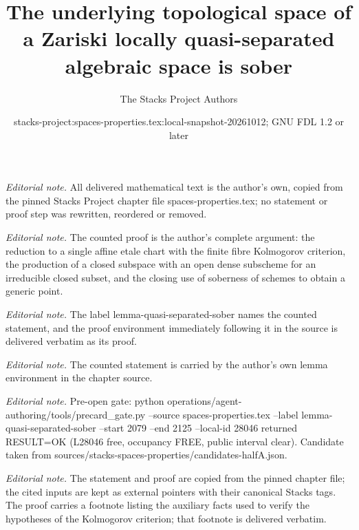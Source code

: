 \documentclass[10pt,a4paper]{amsart}
\title{The underlying topological space of a Zariski locally quasi-separated algebraic space is sober}
\author{The Stacks Project Authors}
\date{stacks-project:spaces-properties.tex:local-snapshot-20261012; GNU FDL 1.2 or later}
\theoremstyle{plain}
\theoremstyle{definition}
\theoremstyle{remark}
\numberwithin{equation}{subsection}
\begin{document}
\maketitle
\noindent\textit{Editorial note.} All delivered mathematical text is the author's own, copied from the pinned Stacks Project chapter file spaces-properties.tex; no statement or proof step was rewritten, reordered or removed.\par\medskip
\noindent\textit{Editorial note.} The counted proof is the author's complete argument: the reduction to a single affine etale chart with the finite fibre Kolmogorov criterion, the production of a closed subspace with an open dense subscheme for an irreducible closed subset, and the closing use of soberness of schemes to obtain a generic point.\par\medskip
\noindent\textit{Editorial note.} The label lemma-quasi-separated-sober names the counted statement, and the proof environment immediately following it in the source is delivered verbatim as its proof.\par\medskip
\noindent\textit{Editorial note.} The counted statement is carried by the author's own lemma environment in the chapter source.\par\medskip
\noindent\textit{Editorial note.} Pre-open gate: python operations/agent-authoring/tools/precard\_gate.py --source spaces-properties.tex --label lemma-quasi-separated-sober --start 2079 --end 2125 --local-id 28046 returned RESULT=OK (L28046 free, occupancy FREE, public interval clear). Candidate taken from sources/stacks-spaces-properties/candidates-halfA.json.\par\medskip
\noindent\textit{Editorial note.} The statement and proof are copied from the pinned chapter file; the cited inputs are kept as external pointers with their canonical Stacks tags. The proof carries a footnote listing the auxiliary facts used to verify the hypotheses of the Kolmogorov criterion; that footnote is delivered verbatim.\par\medskip
\end{document}
